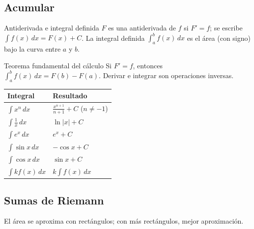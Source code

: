 

\subsection{Acumular}
\begin{tmdef}{Antiderivada e integral definida}
$F$ es una antiderivada de $f$ si $F'=f$; se escribe $\int f(x)\,dx=F(x)+C$. La integral definida $\int_a^bf(x)\,dx$ es el \'area (con signo) bajo la curva entre $a$ y $b$.
\end{tmdef}

\begin{tmdef}{Teorema fundamental del c\'alculo}
Si $F'=f$, entonces $\displaystyle\int_a^bf(x)\,dx=F(b)-F(a)$. Derivar e integrar son operaciones inversas.
\end{tmdef}

\begin{center}
\begin{tabular}{|l|l|}
\hline
\rowcolor{tmAzulClaro}\textbf{Integral} & \textbf{Resultado}\\ \hline
$\int x^n\,dx$ & $\frac{x^{n+1}}{n+1}+C$ \quad ($n\neq-1$)\\ \hline
$\int\frac1x\,dx$ & $\ln|x|+C$\\ \hline
$\int e^x\,dx$ & $e^x+C$\\ \hline
$\int\sin x\,dx$ & $-\cos x+C$\\ \hline
$\int\cos x\,dx$ & $\sin x+C$\\ \hline
$\int kf(x)\,dx$ & $k\int f(x)\,dx$\\ \hline
\end{tabular}
\end{center}

\subsection{Sumas de Riemann}
El \'area se aproxima con rect\'angulos; con m\'as rect\'angulos, mejor aproximaci\'on.

\begin{center}
\end{center}

